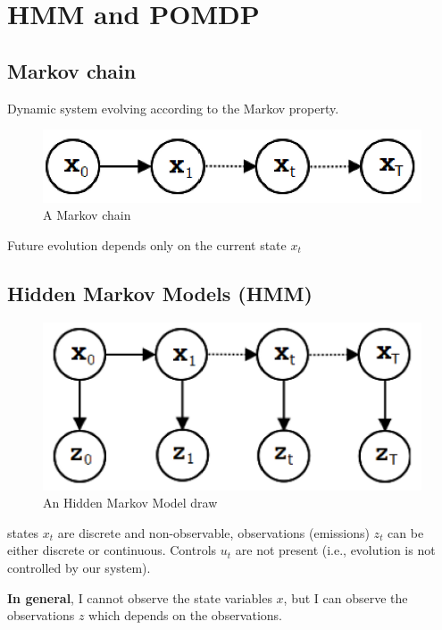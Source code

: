 \section{HMM and POMDP}

\subsection{Markov chain}

Dynamic system evolving according to the Markov property.
\begin{figure}[H]
    \centering
    \includegraphics[width=12cm]{images/Reinforcement Learning/markov_chain.png}
    \caption{A Markov chain}
    \label{fig:markov chain}
\end{figure}
Future evolution depends only on the current state $x_{t}$

\subsection{Hidden Markov Models (HMM)}

\begin{figure}[H]
    \centering
    \includegraphics[width=12cm]{images/Reinforcement Learning/hmm.png}
    \caption{An Hidden Markov Model draw}
    \label{fig:hmm}
\end{figure}
states $x_{t}$ are discrete and non-observable, observations (emissions) $z_{t}$ can be either discrete or continuous. Controls $u_{t}$ are not present (i.e., evolution is not controlled by our system).


\textbf{In general}, I cannot observe the state variables $x$, but I can observe the observations $z$ which depends on the observations.

